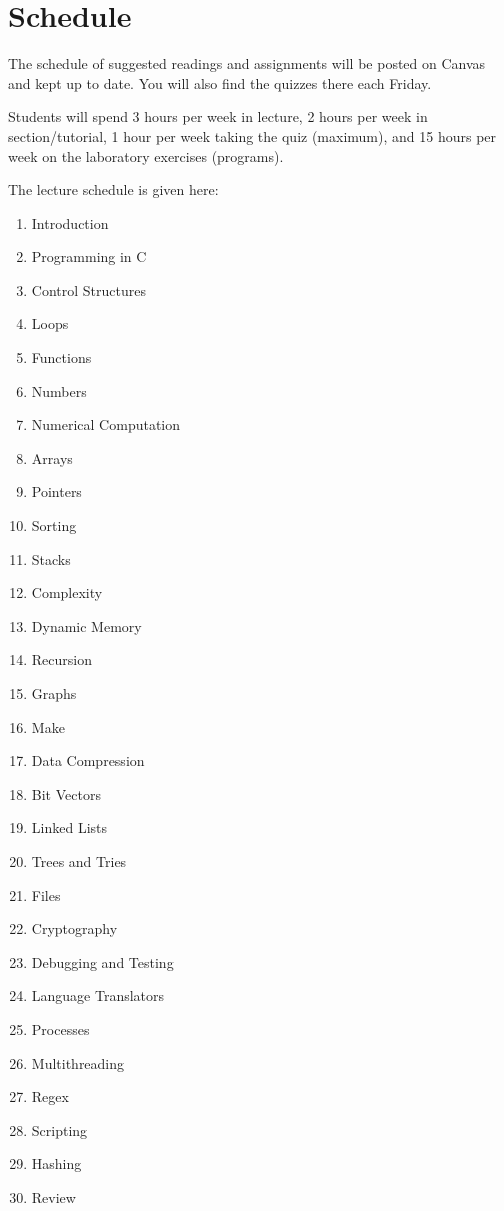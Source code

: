 \documentclass{article}
\begin{document}
\section{Schedule}

The schedule of suggested readings and assignments will be posted on Canvas and
kept up to date. You will also find the quizzes there each Friday.

Students will spend 3 hours per week in lecture, 2 hours per week
in section/tutorial, 1 hour per week taking the quiz (maximum), and
15 hours per week on the laboratory exercises (programs).

The lecture schedule is given here:

\begin{multicols}{3}
  \begin{enumerate}[label*=(\arabic*)]
  \item Introduction
  \item Programming in C
  \item Control Structures
  \item Loops
  \item Functions
  \item Numbers
  \item Numerical Computation
  \item Arrays
  \item Pointers
  \item Sorting
  \item Stacks
  \item Complexity
  \item Dynamic Memory
  \item Recursion
  \item Graphs
  \item Make
  \item Data Compression
  \item Bit Vectors
  \item Linked Lists
  \item Trees and Tries
  \item Files
  \item Cryptography
  \item Debugging and Testing
  \item Language Translators
  \item Processes
  \item Multithreading
  \item Regex
  \item Scripting
  \item Hashing
  \item Review
  \end{enumerate}
\end{multicols}
\end{document}
